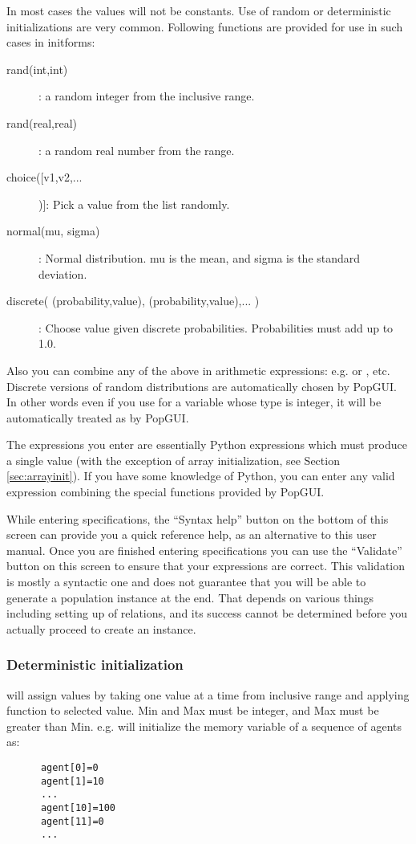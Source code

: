 \documentclass{article}
\begin{document}
In most cases the values will not be constants. Use of random or deterministic initializations are very common. Following functions are provided for use in such cases in initforms:
\begin{description}  
   \item[rand(int,int)]: a random integer from the inclusive range.
   \item[rand(real,real)]: a random real number from the range.
   \item[choice([v1,v2,...])]: Pick a value from the list randomly.
   \item[normal(mu, sigma)]: Normal distribution. mu is the mean, and sigma is the standard deviation. 
   \item[discrete( (probability,value), (probability,value),... )]: Choose value given discrete probabilities. Probabilities must add up to 1.0.
\end{description}

Also you can combine any of the above in arithmetic expressions: e.g.  or , etc. Discrete versions of random distributions are automatically chosen by PopGUI. In other words even if you use  for a variable whose type is integer, it will be automatically treated as   by PopGUI.

The expressions you enter are essentially Python expressions which must produce a single value (with the exception of array initialization, see Section \ref{sec:arrayinit}). If you have some knowledge of Python, you can enter any valid expression combining the special functions provided by PopGUI. 

While entering specifications, the ``Syntax help'' button on the bottom of this screen can provide you a quick reference help, as an alternative to this user manual. Once you are finished entering specifications you can use the ``Validate'' button on this screen to ensure that your expressions are correct. This validation is mostly a syntactic one and does not guarantee that you will be able to generate a population instance at the end. That depends on various things including setting up of relations, and its success cannot be determined before you actually proceed to create an instance.

\subsubsection{Deterministic initialization}
 will assign values by taking one value at a time from inclusive range and applying function to selected value. Min and Max must be integer, and Max must be greater than Min. e.g.  will initialize the memory variable of a sequence of agents as:
     \begin{verbatim}
      agent[0]=0
      agent[1]=10
      ...
      agent[10]=100
      agent[11]=0
      ...
     \end{verbatim}
\end{document}
